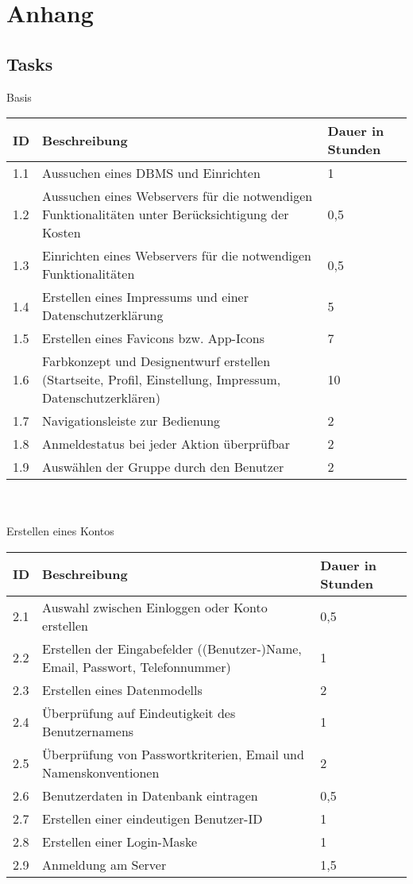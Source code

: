 \chapter{Anhang}
\section*{Tasks} \label{Tasks}
Basis\\
\begin{tabular}[h]{|p{1cm}|p{10cm}|p{3cm}|}
\hline 
ID & Beschreibung & Dauer in Stunden \\ \hline 
1.1 & Aussuchen eines DBMS und Einrichten & 1 \\ \hline 
1.2 & Aussuchen eines Webservers für die notwendigen Funktionalitäten unter Berücksichtigung der Kosten & 0,5\\ \hline 
1.3 & Einrichten eines Webservers für die notwendigen Funktionalitäten & 0,5\\ \hline 
1.4 & Erstellen eines Impressums und einer Datenschutzerklärung & 5\\ \hline 
1.5 & Erstellen eines Favicons bzw. App-Icons & 7\\ \hline 
1.6 & Farbkonzept und Designentwurf erstellen (Startseite, Profil, Einstellung, Impressum, Datenschutzerklären) & 10\\ \hline 
1.7 & Navigationsleiste zur Bedienung & 2\\ \hline 
1.8 & Anmeldestatus bei jeder Aktion überprüfbar & 2\\ \hline 
1.9 & Auswählen der Gruppe durch den Benutzer & 2\\ \hline 
\end{tabular} \\ \\
Erstellen eines Kontos\\
\begin{tabular}[h]{|p{1cm}|p{10cm}|p{3cm}|}
\hline 
ID & Beschreibung & Dauer in Stunden \\ \hline 
2.1 & Auswahl zwischen Einloggen oder Konto erstellen & 0,5\\ \hline
2.2 & Erstellen der Eingabefelder ((Benutzer-)Name, Email, Passwort, Telefonnummer) & 1\\ \hline
2.3 & Erstellen eines Datenmodells & 2\\ \hline
2.4 & Überprüfung auf Eindeutigkeit des Benutzernamens & 1\\\hline
2.5 & Überprüfung von Passwortkriterien, Email und Namenskonventionen & 2\\\hline
2.6 & Benutzerdaten in Datenbank eintragen & 0,5 \\\hline
2.7 & Erstellen einer eindeutigen Benutzer-ID & 1\\\hline
2.8 & Erstellen einer Login-Maske & 1 \\\hline
2.9 & Anmeldung am Server & 1,5 \\\hline
\end{tabular}\newpage
